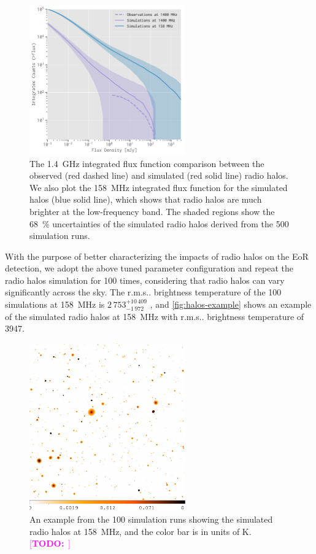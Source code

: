 \documentclass[modern]{aastex62}
\makeatletter
\newcommand{\rms}{r.m.s\@ifnextchar.{}{.\@}}
\newcommand{\TODO}[1]{\textcolor{magenta}{[\textbf{TODO:}~\uuline{#1}]}}
\makeatother
\begin{document}
\begin{figure}
  \centering
  \includegraphics[width=0.6\textwidth]{fluxfunc-simucomp-1400}
  \caption{\label{fig:halos-simucomp}%
    The \SI{1.4}{\GHz} integrated flux function comparison
    between the observed (red dashed line) and simulated (red solid line)
    radio halos.  We also plot the \SI{158}{\MHz} integrated flux function
    for the simulated halos (blue solid line), which shows that radio
    halos are much brighter at the low-frequency band.  The shaded
    regions show the \SI{68}{\percent} uncertainties of the simulated
    radio halos derived from the 500 simulation runs.
  }
\end{figure}

With the purpose of better characterizing the impacts of radio halos
on the EoR detection, we adopt the above tuned parameter configuration
and repeat the radio halos simulation for 100 times, considering that
radio halos can vary significantly across the sky.
The \rms{} brightness temperature of the 100 simulations at
\SI{158}{\MHz} is $2\,753_{-1\,972}^{+10\,409}$ \si{\mK}, and
\autoref{fig:halos-example} shows an example of the simulated radio halos
at \SI{158}{\MHz} with \rms{} brightness temperature of \SI{3947}{\mK}.

\begin{figure}
  \centering
  \includegraphics[width=0.6\textwidth]{halos-f158-heat-log}
  \caption{\label{fig:halos-example}%
    An example from the 100 simulation runs showing the simulated
    radio halos at \SI{158}{\MHz}, and the color bar is in units of
    \si{\kelvin}.
    \TODO{WANG: 增加标度尺}
  }
\end{figure}
\end{document}
